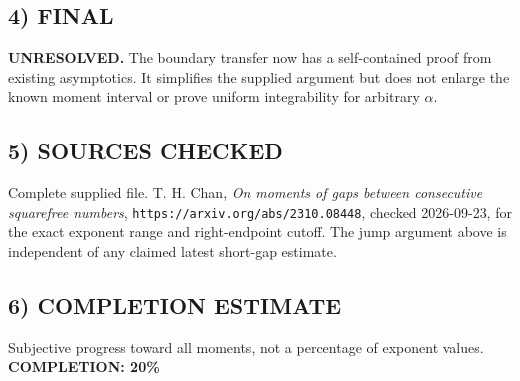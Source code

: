 \subsection*{4) FINAL}
\textbf{UNRESOLVED.} The boundary transfer now has a self-contained proof from existing asymptotics. It simplifies the supplied argument but does not enlarge the known moment interval or prove uniform integrability for arbitrary $\alpha$.
\subsection*{5) SOURCES CHECKED}
Complete supplied file. T. H. Chan, \emph{On moments of gaps between consecutive squarefree numbers}, \texttt{https://arxiv.org/abs/2310.08448}, checked 2026-09-23, for the exact exponent range and right-endpoint cutoff. The jump argument above is independent of any claimed latest short-gap estimate.
\subsection*{6) COMPLETION ESTIMATE}
Subjective progress toward all moments, not a percentage of exponent values.
\textbf{COMPLETION: 20\%}

